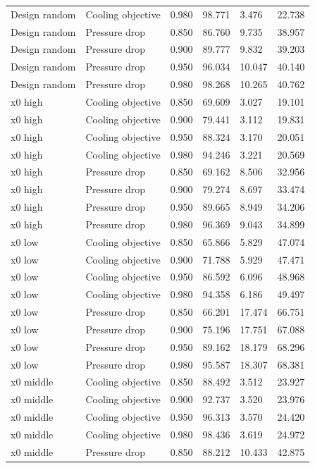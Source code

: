 \begin{longtable}{llllll}
Design random & Cooling objective & 0.980 & 98.771 & 3.476 & 22.738\\
Design random & Pressure drop & 0.850 & 86.760 & 9.735 & 38.957\\
Design random & Pressure drop & 0.900 & 89.777 & 9.832 & 39.203\\
Design random & Pressure drop & 0.950 & 96.034 & 10.047 & 40.140\\
Design random & Pressure drop & 0.980 & 98.268 & 10.265 & 40.762\\
x0 high & Cooling objective & 0.850 & 69.609 & 3.027 & 19.101\\
x0 high & Cooling objective & 0.900 & 79.441 & 3.112 & 19.831\\
x0 high & Cooling objective & 0.950 & 88.324 & 3.170 & 20.051\\
x0 high & Cooling objective & 0.980 & 94.246 & 3.221 & 20.569\\
x0 high & Pressure drop & 0.850 & 69.162 & 8.506 & 32.956\\
x0 high & Pressure drop & 0.900 & 79.274 & 8.697 & 33.474\\
x0 high & Pressure drop & 0.950 & 89.665 & 8.949 & 34.206\\
x0 high & Pressure drop & 0.980 & 96.369 & 9.043 & 34.899\\
x0 low & Cooling objective & 0.850 & 65.866 & 5.829 & 47.074\\
x0 low & Cooling objective & 0.900 & 71.788 & 5.929 & 47.471\\
x0 low & Cooling objective & 0.950 & 86.592 & 6.096 & 48.968\\
x0 low & Cooling objective & 0.980 & 94.358 & 6.186 & 49.497\\
x0 low & Pressure drop & 0.850 & 66.201 & 17.474 & 66.751\\
x0 low & Pressure drop & 0.900 & 75.196 & 17.751 & 67.088\\
x0 low & Pressure drop & 0.950 & 89.162 & 18.179 & 68.296\\
x0 low & Pressure drop & 0.980 & 95.587 & 18.307 & 68.381\\
x0 middle & Cooling objective & 0.850 & 88.492 & 3.512 & 23.927\\
x0 middle & Cooling objective & 0.900 & 92.737 & 3.520 & 23.976\\
x0 middle & Cooling objective & 0.950 & 96.313 & 3.570 & 24.420\\
x0 middle & Cooling objective & 0.980 & 98.436 & 3.619 & 24.972\\
x0 middle & Pressure drop & 0.850 & 88.212 & 10.433 & 42.875\\

\end{longtable}
